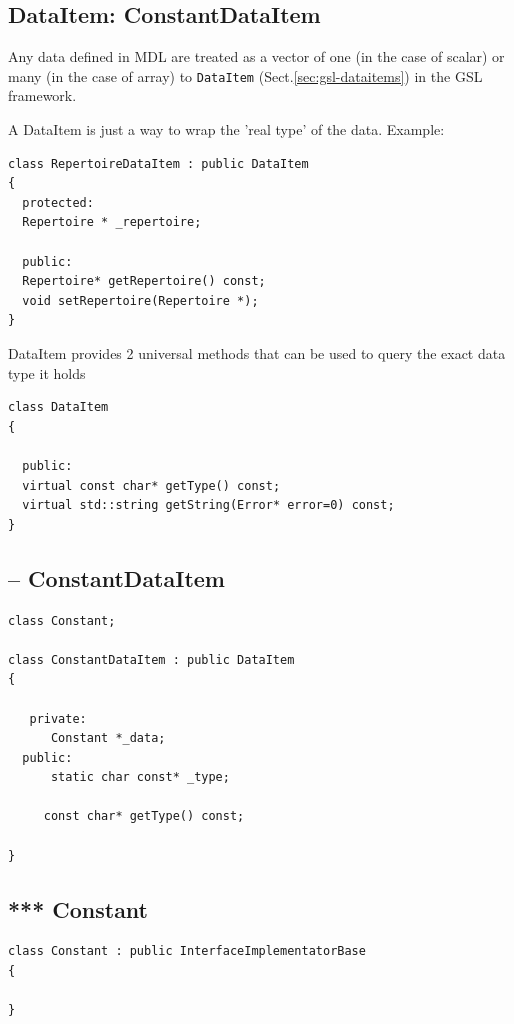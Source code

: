 \subsection{DataItem: ConstantDataItem}
\label{sec:DataItem}

Any data defined in MDL are treated as a vector of one (in the case of scalar)
or many (in the case of array) to \verb!DataItem! (Sect.\ref{sec:gsl-dataitems})
in the GSL framework.

A DataItem is just a way to wrap the 'real type' of the data. Example:
\begin{verbatim}
class RepertoireDataItem : public DataItem
{
  protected:
  Repertoire * _repertoire;
  
  public:
  Repertoire* getRepertoire() const;
  void setRepertoire(Repertoire *);  
}
\end{verbatim}

DataItem provides 2 universal methods that can be used to query the exact
data type it holds
\begin{verbatim}
class DataItem
{

  public:
  virtual const char* getType() const;
  virtual std::string getString(Error* error=0) const;
}
\end{verbatim}

\subsection{-- ConstantDataItem}
\label{sec:ConstantDataItem}


\begin{lstlisting}
class Constant;

class ConstantDataItem : public DataItem
{

   private:
      Constant *_data;
  public:
      static char const* _type;

     const char* getType() const;

}
\end{lstlisting}

\subsection{*** Constant}
\label{sec:Constant-MDL-C++}

\begin{lstlisting}
class Constant : public InterfaceImplementatorBase
{

}
\end{lstlisting}

